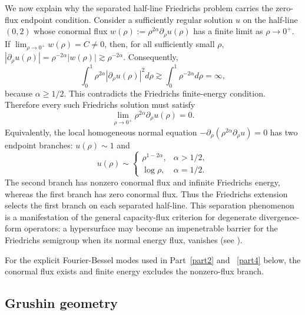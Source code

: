 \documentclass[12pt]{amsart}
\begin{document}
We now explain why the separated half-line Friedrichs problem carries the zero-flux endpoint condition. Consider a sufficiently regular solution $u$ on the half-line $(0,2)$ whose conormal flux $w(\rho):=\rho^{2\alpha}\partial_\rho u(\rho)$ has a finite limit as $\rho\to0^+$. If $\lim_{\rho\to0^+}w(\rho)=C\ne 0$, then, for all sufficiently small $\rho$, $|\partial_\rho u(\rho)|= \rho^{-2\alpha}|w(\rho)| \gtrsim \rho^{-2\alpha}$. Consequently,
\begin{equation*}
\int_0^1 \rho^{2\alpha}|\partial_\rho u(\rho)|^2 d\rho
\gtrsim
\int_0^1 \rho^{-2\alpha} d\rho
=\infty,    
\end{equation*}
because $\alpha\ge 1/2$. This contradicts the Friedrichs finite-energy condition. Therefore every such Friedrichs solution must satisfy
\begin{equation}\label{eq_supercritical_zero_flux}
    \lim_{\rho\to0^+}\rho^{2\alpha}\partial_\rho u(\rho)=0.
\end{equation}
Equivalently, the local homogeneous normal equation $-\partial_\rho\left(\rho^{2\alpha}\partial_\rho u\right)=0$ has two endpoint branches: $u(\rho)\sim 1$ and
\begin{equation*}
u(\rho)\sim
\begin{cases}
\rho^{1-2\alpha}, & \alpha>1/2,\\
\log\rho, & \alpha=1/2.
\end{cases}    
\end{equation*}
The second branch has nonzero conormal flux and infinite Friedrichs energy, whereas the first branch has zero conormal flux. Thus the Friedrichs extension selects the first branch on each separated half-line. This separation phenomenon is a manifestation of the general capacity-flux criterion for degenerate divergence-form operators: a hypersurface may become an impenetrable barrier for the Friedrichs semigroup when its normal energy flux, vanishes (see \cite{RS_flux}).

For the explicit Fourier-Bessel modes used in Part~\ref{part2} and ~\ref{part4} below, the conormal flux exists and finite energy excludes the nonzero-flux branch.









 

\subsection{Grushin geometry}
\end{document}
